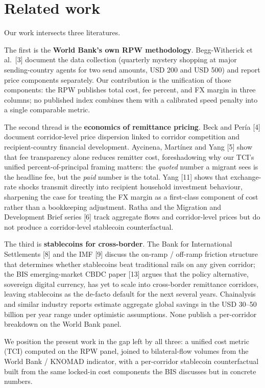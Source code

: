 \documentclass[
  11pt,
]{article}
\begin{document}
\section{Related work}\label{related-work}

Our work intersects three literatures.

The first is the \textbf{World Bank's own RPW methodology}.
Begg-Witherick et al.~{[}3{]} document the data collection (quarterly
mystery shopping at major sending-country agents for two send amounts,
USD 200 and USD 500) and report price components separately. Our
contribution is the unification of those components: the RPW publishes
total cost, fee percent, and FX margin in three columns; no published
index combines them with a calibrated speed penalty into a single
comparable metric.

The second thread is the \textbf{economics of remittance pricing}. Beck
and Pería {[}4{]} document corridor-level price dispersion linked to
corridor competition and recipient-country financial development.
Aycinena, Martínez and Yang {[}5{]} show that fee transparency alone
reduces remitter cost, foreshadowing why our TCI's unified
percent-of-principal framing matters: the \emph{quoted} number a migrant
sees is the headline fee, but the \emph{paid} number is the total. Yang
{[}11{]} shows that exchange-rate shocks transmit directly into
recipient household investment behaviour, sharpening the case for
treating the FX margin as a first-class component of cost rather than a
bookkeeping adjustment. Ratha and the Migration and Development Brief
series {[}6{]} track aggregate flows and corridor-level prices but do
not produce a corridor-level stablecoin counterfactual.

The third is \textbf{stablecoins for cross-border}. The Bank for
International Settlements {[}8{]} and the IMF {[}9{]} discuss the
on-ramp / off-ramp friction structure that determines whether
stablecoins beat traditional rails on any given corridor; the BIS
emerging-market CBDC paper {[}13{]} argues that the policy alternative,
sovereign digital currency, has yet to scale into cross-border
remittance corridors, leaving stablecoins as the de-facto default for
the next several years. Chainalysis and similar industry reports
estimate aggregate global savings in the USD 30--50 billion per year
range under optimistic assumptions. None publish a per-corridor
breakdown on the World Bank panel.

We position the present work in the gap left by all three: a unified
cost metric (TCI) computed on the RPW panel, joined to bilateral-flow
volumes from the World Bank / KNOMAD indicator, with a per-corridor
stablecoin counterfactual built from the same locked-in cost components
the BIS discusses but in concrete numbers.
\end{document}
